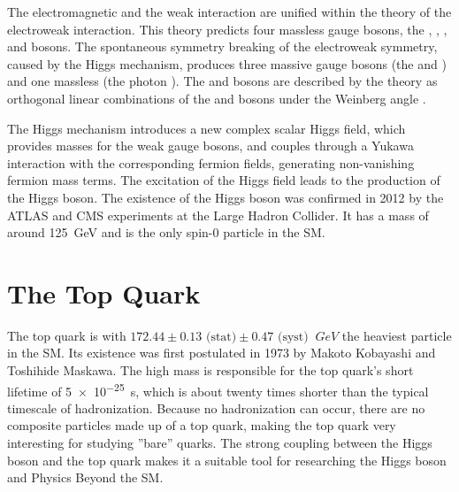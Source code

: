 The electromagnetic and the weak interaction are unified within the theory of the electroweak interaction. This theory predicts four massless gauge bosons, the \PBzero, \PWzero, \PWone, and \PWtwo bosons. The spontaneous symmetry breaking of the electroweak symmetry, caused by the Higgs mechanism, produces three massive gauge bosons (the \PZzero and \PWpm) and one massless (the photon \Pphoton). The \PZzero and \PWpm bosons are described by the theory as orthogonal linear combinations of the \PBzero and \PWzero bosons under the Weinberg angle \cite{wiki:electroweak}.

The Higgs mechanism introduces a new complex scalar Higgs field, which provides masses for the weak gauge bosons, and couples through a Yukawa interaction with the corresponding fermion fields, generating non-vanishing fermion mass terms. The excitation of the Higgs field leads to the production of the Higgs boson. The existence of the Higgs boson was confirmed in 2012 by the ATLAS and CMS experiments at the Large Hadron Collider. It has a mass of around \SI{125}{\giga\eV} \cite{Cha12} and is the only spin-0 particle in the SM.

\section{The Top Quark}
\label{sec:theory_top}
The top quark is with $172.44 \pm 0.13 \text{ (stat)} \pm 0.47 \text{ (syst) }\SI{}{GeV}$ \cite{ACCC14} the heaviest particle in the SM. Its existence was first postulated in 1973 by Makoto Kobayashi and Toshihide Maskawa. The high mass is responsible for the top quark's short lifetime of \SI{5e-25}{s}, which is about twenty times shorter than the typical timescale of hadronization. Because no hadronization can occur, there are no composite particles made up of a top quark, making the top quark very interesting for studying ''bare'' quarks. The strong coupling between the Higgs boson and the top quark makes it a suitable tool for researching the Higgs boson and Physics Beyond the SM.

